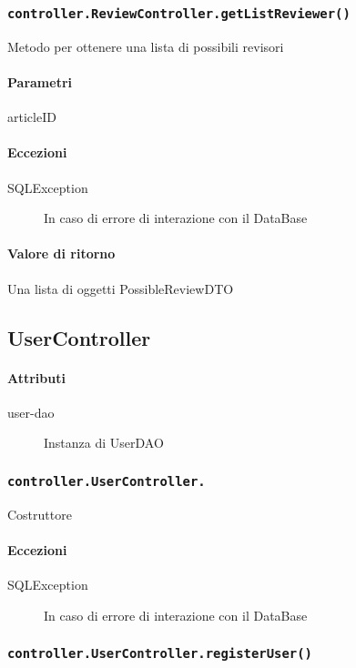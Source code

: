 \subsubsection{\texttt{controller.ReviewController.getListReviewer()}}
Metodo per ottenere una lista di possibili revisori
\paragraph{Parametri}
\begin{description}
\item articleID
\end{description}
\paragraph{Eccezioni}
\begin{description}
\item[SQLException] In caso di errore di interazione con il DataBase
\end{description}
\paragraph{Valore di ritorno}
Una lista di oggetti PossibleReviewDTO


\subsection{UserController}
\paragraph{Attributi}
\begin{description}
\item[user-dao] Instanza di UserDAO
\end{description}

\subsubsection{\texttt{controller.UserController.}}
Costruttore
\paragraph{Eccezioni}
\begin{description}
\item[SQLException] In caso di errore di interazione con il DataBase
\end{description}

\subsubsection{\texttt{controller.UserController.registerUser()}}
